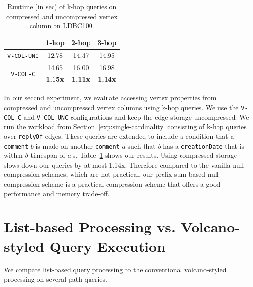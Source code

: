 \begin{table}
	\centering
	\bgroup
	\setlength{\tabcolsep}{8pt}
	\def\arraystretch{1.2}%
	\begin{tabular}{ |c|c|c|c| } 
		\hline
		& \textbf{1-hop} & \textbf{2-hop} & \textbf{3-hop} \\
		\hline \hline
		\texttt{V-COL-UNC}& 12.78 & 14.47 & 14.95\\ 
		\hline
		\multirow{2}{*}{\texttt{V-COL-C}}& 14.65 & 16.00 & 16.98 \\ 
		& \textbf{1.15x} & \textbf{1.11x} & \textbf{1.14x}\\ 
		\hline  
	\end{tabular}
	\egroup
	\captionsetup{justification=centering}
	\caption{Runtime (in sec) of k-hop queries on compressed and uncompressed vertex column on LDBC100.}
	\label{tbl:s3}
\end{table}

In our second experiment, we evaluate accessing vertex properties from compressed and uncompressed vertex columns using k-hop queries. We use the \texttt{V-COL-C} and \texttt{V-COL-UNC} configurations and keep the edge storage uncompressed. We run the workload from Section~\ref{exp:single-cardinality} consisting of k-hop queries over \texttt{replyOf} edges. These queries are extended to include a condition that a \texttt{comment} $b$ is made on another \texttt{comment} $a$ such that $b$ has a \texttt{creationDate} that is within $\delta$ timespan of $a$'s. Table~\ref{tbl:s3} shows our results. Using compressed storage slows down our queries by at most 1.14x. Therefore compared to the vanilla null compression schemes, which are not practical, our prefix sum-based null compression scheme is a practical compression scheme that offers a good performance and memory trade-off.

\section{List-based Processing vs. Volcano-styled Query Execution}
\label{exp:list-based}

We compare list-based query processing to the conventional volcano-styled processing on several path queries. 






















